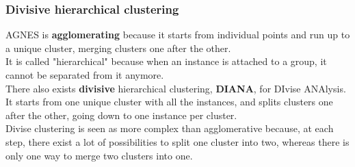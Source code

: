 \begin{frame}
\frametitle{Divisive hierarchical clustering}
AGNES is {\bf agglomerating} because it starts from individual points and run up to a unique cluster, merging clusters one after the other. \\
\vspace{0.3cm}
It is called "hierarchical" because when an instance is attached to a group, it cannot be separated from it anymore.\\
\vspace{0.3cm} 
There also exists {\bf divisive} hierarchical clustering, {\bf DIANA}, for DIvise ANAlysis. It starts from one unique cluster with all the instances, and splits clusters one after the other, going down to one instance per cluster. \\
\vspace{0.3cm} 
Divise clustering is seen as more complex than agglomerative because, at each step, there exist a lot of possibilities to split one cluster into two, whereas there is only one way to merge two clusters into one.
\end{frame}
